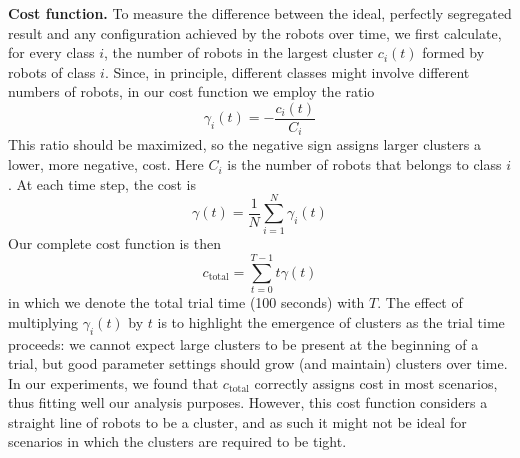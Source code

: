\documentclass[letterpaper, 10 pt, conference]{ieeeconf}
\newcommand{\myparagraph}[1]{\textbf{#1.}}
\begin{document}
  \myparagraph{Cost function}
  To measure the difference between the ideal, perfectly segregated result and any
  configuration achieved by the robots over time, we first calculate, for every
  class $i$, the number of robots in the largest cluster $c_i(t)$ formed by robots of class $i$.  Since,
  in principle, different classes might involve different numbers of robots, in
  our cost function we employ the ratio
  $$
  \gamma_i(t) = -\frac{c_i(t)}{C_i}
  $$
  This ratio should be maximized, so the negative sign assigns larger clusters a lower, more negative, cost.
  Here $C_i$ is the number of robots that belongs to class $i$. At each time step, the cost is
  $$
  \gamma(t) = \frac{1}{N}\sum_{i=1}^N\gamma_i(t)
  $$
  Our complete cost function is then
  \begin{equation}
    \label{eq:cost_function}
    c_{\text{total}} =  \sum_{t=0}^{T-1} t\gamma(t)
  \end{equation}
  in which we denote the total trial time (100 seconds) with $T$. The effect of multiplying $\gamma_i(t)$ by $t$ is to highlight the
  emergence of clusters as the trial time proceeds: we cannot expect large
  clusters to be present at the beginning of a trial, but good parameter settings
  should grow (and maintain) clusters over time. In our experiments, we found that
  $c_{\text{total}}$ correctly assigns cost in most scenarios, thus fitting
  well our analysis purposes. However, this cost function considers a straight
  line of robots to be a cluster, and as such it might not be ideal for scenarios
  in which the clusters are required to be tight.
\end{document}

